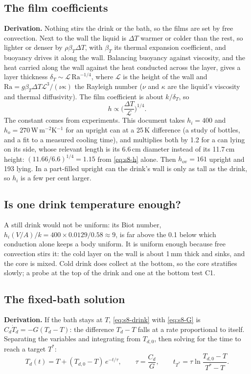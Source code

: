 \documentclass[11pt,a4paper]{article}
\newcommand{\hov}{h_{\mathrm{ov}}}
\newcommand{\para}[1]{\par\smallskip\noindent\textbf{#1}\enspace}
\begin{document}
\subsection{The film coefficients}
\para{Derivation.} Nothing stirs the drink or the bath, so the films are set by free convection. Next to
the wall the liquid is $\Delta T$ warmer or colder than the rest, so lighter or denser by $\rho\beta_T\Delta T$,
with $\beta_T$ its thermal expansion coefficient, and buoyancy drives it along the wall. Balancing buoyancy
against viscosity, and the heat carried along the wall against the heat conducted across the layer, gives
a layer thickness $\delta_T \sim \mathcal L\,\mathrm{Ra}^{-1/4}$, where $\mathcal L$ is the height of the wall
and $\mathrm{Ra} = g\beta_T\Delta T\mathcal L^3/(\nu\kappa)$ the Rayleigh number ($\nu$ and $\kappa$ are the
liquid's viscosity and thermal diffusivity). The film coefficient is about $k/\delta_T$, so
\begin{equation}
h \propto \Big(\frac{\Delta T}{\mathcal L}\Big)^{1/4}. \label{eq:s8-h}
\end{equation}
The constant comes from experiments. This document takes $h_i = 400$ and $h_o = 270$\,W\,m$^{-2}$K$^{-1}$ for
an upright can at a 25\,K difference (a study of bottles, and a fit to a measured cooling time), and
multiplies both by 1.2 for a can lying on its side, whose relevant length is its 6.6\,cm diameter instead of
its 11.7\,cm height: $(11.66/6.6)^{1/4} = 1.15$ from \eqref{eq:s8-h} alone. Then $\hov = 161$ upright and
193 lying. In a part-filled upright can the drink's wall is only as tall as the drink, so $h_i$ is a few per
cent larger.

\subsection{Is one drink temperature enough?}
A still drink would not be uniform: its Biot number, $h_i(V/A)/k = 400\times0.0129/0.58 \approx 9$, is far
above the 0.1 below which conduction alone keeps a body uniform. It is uniform enough because free
convection stirs it: the cold layer on the wall is about 1\,mm thick and sinks, and the core is mixed. Cold
drink does collect at the bottom, so the core stratifies slowly; a probe at the top of the drink and one at
the bottom test C1.

\subsection{The fixed-bath solution}
\para{Derivation.} If the bath stays at $T$, \eqref{eq:s8-drink} with \eqref{eq:s8-G} is
$C_d\dot T_d = -G(T_d - T)$: the difference $T_d - T$ falls at a rate proportional to itself. Separating the
variables and integrating from $T_{d,0}$, then solving for the time to reach a target $T^*$:
\begin{equation}
T_d(t) = T + (T_{d,0} - T)\,e^{-t/\tau},\qquad \tau = \frac{C_d}{G},\qquad
t_{T^*} = \tau\ln\frac{T_{d,0} - T}{T^* - T}. \label{eq:s8-fixed}
\end{equation}
\end{document}
